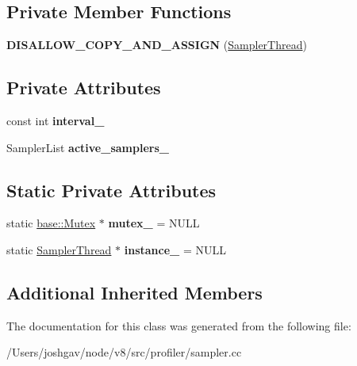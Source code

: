 \subsection*{Private Member Functions}
\begin{DoxyCompactItemize}
\item 
{\bfseries D\+I\+S\+A\+L\+L\+O\+W\+\_\+\+C\+O\+P\+Y\+\_\+\+A\+N\+D\+\_\+\+A\+S\+S\+I\+GN} (\hyperlink{classv8_1_1internal_1_1_sampler_thread}{Sampler\+Thread})\hypertarget{classv8_1_1internal_1_1_sampler_thread_aa119e701f2636732f0a57a22cc23b65d}{}\label{classv8_1_1internal_1_1_sampler_thread_aa119e701f2636732f0a57a22cc23b65d}

\end{DoxyCompactItemize}
\subsection*{Private Attributes}
\begin{DoxyCompactItemize}
\item 
const int {\bfseries interval\+\_\+}\hypertarget{classv8_1_1internal_1_1_sampler_thread_a306ab15b291bf30f6927b516b9e2552e}{}\label{classv8_1_1internal_1_1_sampler_thread_a306ab15b291bf30f6927b516b9e2552e}

\item 
Sampler\+List {\bfseries active\+\_\+samplers\+\_\+}\hypertarget{classv8_1_1internal_1_1_sampler_thread_aedcc93f9daf0e3b03ea7d1ba94f26762}{}\label{classv8_1_1internal_1_1_sampler_thread_aedcc93f9daf0e3b03ea7d1ba94f26762}

\end{DoxyCompactItemize}
\subsection*{Static Private Attributes}
\begin{DoxyCompactItemize}
\item 
static \hyperlink{classv8_1_1base_1_1_mutex}{base\+::\+Mutex} $\ast$ {\bfseries mutex\+\_\+} = N\+U\+LL\hypertarget{classv8_1_1internal_1_1_sampler_thread_a042c88226d66073ad107a41c4e6e4545}{}\label{classv8_1_1internal_1_1_sampler_thread_a042c88226d66073ad107a41c4e6e4545}

\item 
static \hyperlink{classv8_1_1internal_1_1_sampler_thread}{Sampler\+Thread} $\ast$ {\bfseries instance\+\_\+} = N\+U\+LL\hypertarget{classv8_1_1internal_1_1_sampler_thread_ab03e0098148073404ed0d9165158c53e}{}\label{classv8_1_1internal_1_1_sampler_thread_ab03e0098148073404ed0d9165158c53e}

\end{DoxyCompactItemize}
\subsection*{Additional Inherited Members}


The documentation for this class was generated from the following file\+:\begin{DoxyCompactItemize}
\item 
/\+Users/joshgav/node/v8/src/profiler/sampler.\+cc\end{DoxyCompactItemize}
